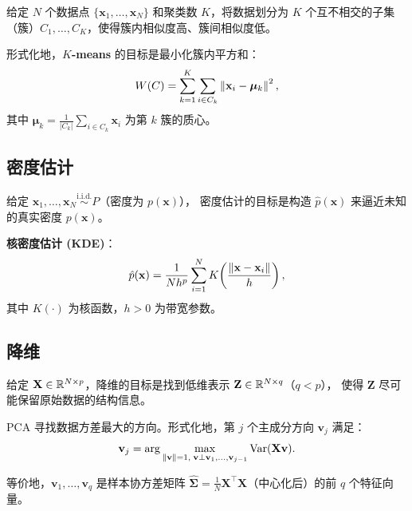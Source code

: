 \begin{definition}[聚类问题]
给定 $N$ 个数据点 $\{\mathbf{x}_1, \dots, \mathbf{x}_N\}$ 和聚类数 $K$，将数据划分为 $K$ 个互不相交的子集（簇）$C_1, \dots, C_K$，使得簇内相似度高、簇间相似度低。

形式化地，\textbf{$K$-means} 的目标是最小化簇内平方和：
\begin{equation}\label{eq:kmeans}
    W(C) = \sum_{k=1}^{K} \sum_{i \in C_k} \left\lVert\mathbf{x}_i - \bm{\mu}_k\right\rVert^2,
\end{equation}
其中 $\bm{\mu}_k = \frac{1}{|C_k|} \sum_{i \in C_k} \mathbf{x}_i$ 为第 $k$ 簇的质心。
\end{definition}

\subsection{密度估计}

\begin{definition}[密度估计]
给定 $\mathbf{x}_1, \dots, \mathbf{x}_N \stackrel{\mathrm{i.i.d.}}{\sim} P$（密度为 $p(\mathbf{x})$），
密度估计的目标是构造 $\hat{p}(\mathbf{x})$ 来逼近未知的真实密度 $p(\mathbf{x})$。

\textbf{核密度估计 (KDE)}：
\begin{equation}\label{eq:kde}
    \hat{p}(\mathbf{x}) = \frac{1}{N h^p} \sum_{i=1}^{N} K\!\left(\frac{\left\lVert\mathbf{x} - \mathbf{x}_i\right\rVert}{h}\right),
\end{equation}
其中 $K(\cdot)$ 为核函数，$h > 0$ 为带宽参数。
\end{definition}

\subsection{降维}

\begin{definition}[降维问题]
给定 $\mathbf{X} \in \mathbb{R}^{N \times p}$，降维的目标是找到低维表示 $\mathbf{Z} \in \mathbb{R}^{N \times q}$（$q < p$），
使得 $\mathbf{Z}$ 尽可能保留原始数据的结构信息。
\end{definition}

\begin{definition}
PCA 寻找数据方差最大的方向。形式化地，第 $j$ 个主成分方向 $\mathbf{v}_j$ 满足：
\begin{equation}\label{eq:pca}
    \mathbf{v}_j = \arg\max_{\left\lVert\mathbf{v}\right\rVert = 1,\; \mathbf{v} \perp \mathbf{v}_1, \dots, \mathbf{v}_{j-1}}
                   \mathrm{Var}(\mathbf{X} \mathbf{v}).
\end{equation}

等价地，$\mathbf{v}_1, \dots, \mathbf{v}_q$ 是样本协方差矩阵 $\widehat{\bm{\Sigma}} = \frac{1}{N} \mathbf{X}^\top \mathbf{X}$（中心化后）的前 $q$ 个特征向量。
\end{definition}

